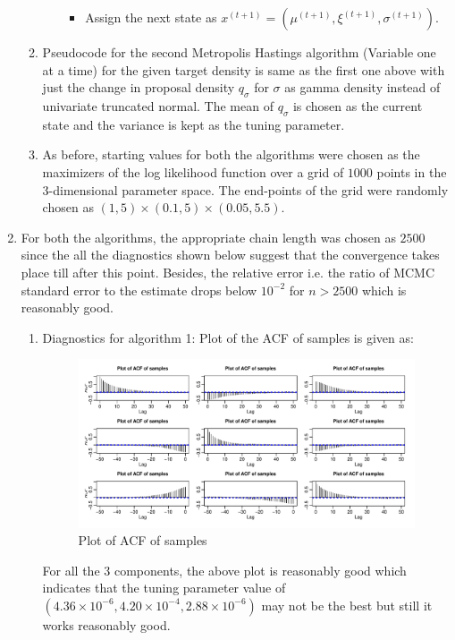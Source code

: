 \documentclass[12pt]{article}
\begin{document}
\begin{enumerate}[label=(\alph*)]
\begin{enumerate}[label=(\roman*)]
\begin{itemize}
\begin{itemize}
\item Assign the next state as $x^{(t+1)}=(\mu^{(t+1)},\xi^{(t+1)},\sigma^{(t+1)})$.
\end{itemize}
\end{itemize}
\item Pseudocode for the second Metropolis Hastings algorithm (Variable one at a time) for the given target density is same as the first one above with just the change in proposal density $q_\sigma$ for $\sigma$ as gamma density instead of univariate truncated normal. The mean of $q_\sigma$ is chosen as the current state and the variance is kept as the tuning parameter.
\item As before, starting values for both the algorithms were chosen as the maximizers of the log likelihood function over a grid of $1000$ points in the 3-dimensional parameter space. The end-points of the grid were randomly chosen as $(1,5)\times(0.1,5)\times(0.05,5.5)$.
\end{enumerate}
\item For both the algorithms, the appropriate chain length was chosen as $2500$ since the all the diagnostics shown below suggest that the convergence takes place till after this point. Besides, the relative error i.e. the ratio of MCMC standard error to the estimate drops below $10^{-2}$ for $n>2500$ which is reasonably good. 
\clearpage
\begin{enumerate}[label=(\roman*)]
\item Diagnostics for algorithm 1:
Plot of the ACF of samples is given as:
\begin{figure}[H]
\begin{centering}
\includegraphics{aua257HW3-004}
\caption{Plot of ACF of samples}
\end{centering}
\end{figure}
For all the 3 components, the above plot is reasonably good which indicates that the tuning parameter value of $(4.36\times 10^{-6}, 4.20\times 10^{-4}, 2.88\times 10^{-6})$ may not be the best but still it works reasonably good.


\end{enumerate}
\end{enumerate}
\end{document}
